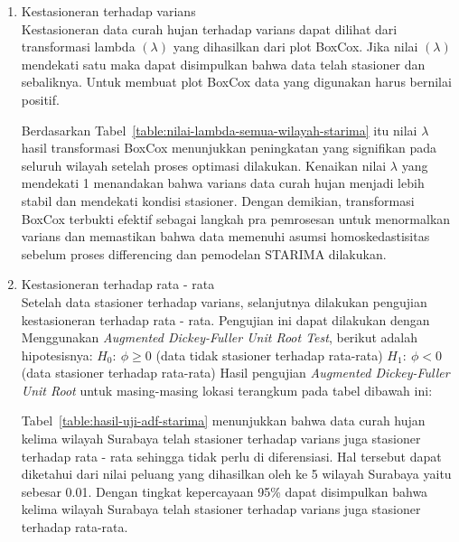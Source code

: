 \begin{enumerate}[label=\Alph*.]
    \item Kestasioneran terhadap varians \\
    Kestasioneran data curah hujan terhadap varians dapat dilihat dari transformasi lambda $(\lambda)$ yang dihasilkan dari plot BoxCox.
    Jika nilai $(\lambda)$ mendekati satu maka dapat disimpulkan bahwa data telah stasioner dan sebaliknya. Untuk membuat plot BoxCox data yang digunakan harus bernilai positif.
    
    Berdasarkan Tabel~\ref{table:nilai-lambda-semua-wilayah-starima} itu nilai $\lambda$ hasil transformasi BoxCox menunjukkan peningkatan yang signifikan pada seluruh wilayah setelah proses optimasi dilakukan.
    Kenaikan nilai $\lambda$ yang mendekati 1 menandakan bahwa varians data curah hujan menjadi lebih stabil dan mendekati kondisi stasioner.
    Dengan demikian, transformasi BoxCox terbukti efektif sebagai langkah pra pemrosesan untuk menormalkan varians dan memastikan bahwa data memenuhi asumsi homoskedastisitas sebelum proses differencing dan pemodelan STARIMA dilakukan.

    \item Kestasioneran terhadap rata - rata \\
    Setelah data stasioner terhadap varians, selanjutnya dilakukan pengujian kestasioneran terhadap rata - rata.
    Pengujian ini dapat dilakukan dengan Menggunakan \textit{Augmented Dickey-Fuller Unit Root Test}, berikut adalah hipotesisnya:
    $H_0:\ \phi \ge 0$ (data tidak stasioner terhadap rata-rata)  
    $H_1:\ \phi < 0$ (data stasioner terhadap rata-rata)
    Hasil pengujian \textit{Augmented Dickey-Fuller Unit Root} untuk masing-masing lokasi terangkum pada tabel dibawah ini:
    
    Tabel~\ref{table:hasil-uji-adf-starima} menunjukkan bahwa data curah hujan kelima wilayah Surabaya telah stasioner terhadap varians juga stasioner terhadap rata - rata sehingga tidak perlu di diferensiasi.
    Hal tersebut dapat diketahui dari nilai peluang yang dihasilkan oleh ke 5 wilayah Surabaya yaitu sebesar 0.01.
    Dengan tingkat kepercayaan 95\% dapat disimpulkan bahwa kelima wilayah Surabaya telah stasioner terhadap varians juga stasioner terhadap rata-rata.


\end{enumerate}
